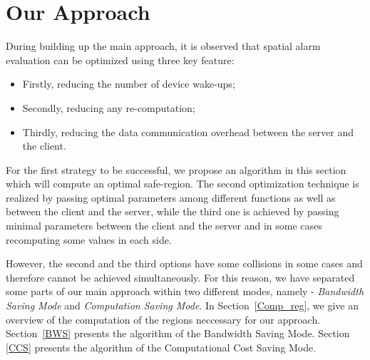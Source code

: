 \chapter{Our Approach}
\label{chap:ourapp}




During building up the main approach, it is observed that spatial alarm evaluation can be optimized using three key feature: 
\begin{itemize}
\setlength\itemsep{0em}
\item Firstly, reducing the number of device wake-ups;
\item Secondly, reducing any re-computation;
\item Thirdly, reducing the data communication overhead between the server and the client.
\end{itemize}

For the first strategy to be successful, we propose an algorithm in this section which will compute an optimal safe-region. The second optimization technique is realized by passing optimal parameters among different functions as well as between the client and the server, while the third one is achieved by passing minimal parameters between the client and the server and in some cases recomputing some values in each side.

However, the second and the third options have some collisions in some cases and therefore cannot be achieved simultaneously. For this reason, we have separated some parts of our main approach within two different modes, namely - \textit{Bandwidth Saving Mode} and \textit{Computation Saving Mode}.
\vspace{5pt}
In Section~\ref{Comp_reg}, we give an overview of the computation of the regions neccessary for our approach. Section~\ref{BWS} presents the algorithm of the Bandwidth Saving Mode. Section \ref{CCS} presents the algorithm of the Computational Cost Saving Mode.

